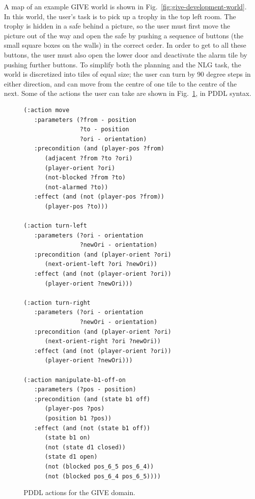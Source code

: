 A map of an example GIVE world is shown in
Fig.~\ref{fig:give-development-world}.  In this world, the user's task is
to pick up a trophy in the top left room.  The trophy is hidden in a safe
behind a picture, so the user must first move the picture out of the way
and open the safe by pushing a sequence of buttons (the small square boxes
on the walls) in the correct order.  In order to get to all these buttons,
the user must also open the lower door and deactivate the alarm tile by
pushing further buttons.  To simplify both the planning and the NLG task,
the world is discretized into tiles of equal size; the user can turn by 90
degree steps in either direction, and can move from the centre of one tile
to the centre of the next. Some of the actions the user can take are shown
in Fig.~\ref{fig:give-planning}, in PDDL syntax.

\begin{figure}[t]
{\small%
\begin{verbatim}
(:action move
   :parameters (?from - position
                ?to - position
                ?ori - orientation)
   :precondition (and (player-pos ?from) 
      (adjacent ?from ?to ?ori) 
      (player-orient ?ori)
      (not-blocked ?from ?to)
      (not-alarmed ?to))
   :effect (and (not (player-pos ?from))
      (player-pos ?to)))

(:action turn-left
   :parameters (?ori - orientation
                ?newOri - orientation)
   :precondition (and (player-orient ?ori)
      (next-orient-left ?ori ?newOri))
   :effect (and (not (player-orient ?ori))
      (player-orient ?newOri)))

(:action turn-right
   :parameters (?ori - orientation
                ?newOri - orientation)
   :precondition (and (player-orient ?ori)
      (next-orient-right ?ori ?newOri))
   :effect (and (not (player-orient ?ori))
      (player-orient ?newOri)))

(:action manipulate-b1-off-on
   :parameters (?pos - position)
   :precondition (and (state b1 off)
      (player-pos ?pos)
      (position b1 ?pos))
   :effect (and (not (state b1 off))
      (state b1 on)
      (not (state d1 closed))
      (state d1 open) 
      (not (blocked pos_6_5 pos_6_4))
      (not (blocked pos_6_4 pos_6_5))))
\end{verbatim}}%
\caption{PDDL actions for the GIVE domain.}
\label{fig:give-planning}
\end{figure}

